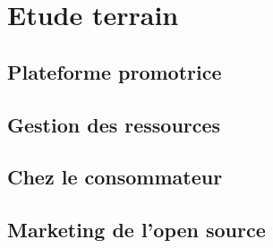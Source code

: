 \chapter{Etude terrain} %
	\section{Plateforme promotrice}
	\section{Gestion des ressources}
	\section{Chez le consommateur}
	\section{Marketing de l'open source}